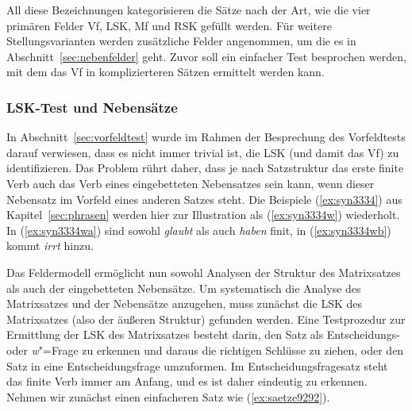All diese Bezeichnungen kategorisieren die Sätze nach der Art, wie die vier primären Felder Vf, LSK, Mf und RSK gefüllt werden.
Für weitere Stellungsvarianten werden zusätzliche Felder angenommen, um die es in Abschnitt~\ref{sec:nebenfelder} geht.
Zuvor soll ein einfacher Test besprochen werden, mit dem das Vf in komplizierteren Sätzen ermittelt werden kann.

\subsubsection{LSK-Test und Nebensätze}

\label{sec:lsktest}

In Abschnitt~\ref{sec:vorfeldtest} wurde im Rahmen der Besprechung des Vorfeldtests darauf verwiesen, dass es nicht immer trivial ist, die LSK (und damit das Vf) zu identifizieren.
Das Problem rührt daher, dass je nach Satzstruktur das erste finite Verb auch das Verb eines eingebetteten Nebensatzes sein kann, wenn dieser Nebensatz \zB im Vorfeld eines anderen Satzes steht.
Die Beispiele (\ref{ex:syn3334}) aus Kapitel~\ref{sec:phrasen} werden hier zur Illustration als (\ref{ex:syn3334w}) wiederholt.
In (\ref{ex:syn3334wa}) sind sowohl \textit{glaubt} als auch \textit{haben} finit, in (\ref{ex:syn3334wb}) kommt \textit{irrt} hinzu.

\begin{exe}
  \ex\label{ex:syn3334w}
  \begin{xlist}
  \end{xlist}
\end{exe}

Das Feldermodell ermöglicht nun sowohl Analysen der Struktur des Matrixsatzes als auch der eingebetteten Nebensätze.
Um systematisch die Analyse des Matrixsatzes und der Nebensätze anzugehen, muss zunächst die LSK des Matrixsatzes (also der äußeren Struktur) gefunden werden.
Eine Testprozedur zur Ermittlung der LSK des Matrixsatzes besteht darin, den Satz als Entscheidungs- oder \textit{w}"=Frage zu erkennen und daraus die richtigen Schlüsse zu ziehen, oder den Satz in eine Entscheidungsfrage umzuformen.
Im Entscheidungsfragesatz steht das finite Verb immer am Anfang, und es ist daher eindeutig zu erkennen.
Nehmen wir zunächst einen einfacheren Satz wie (\ref{ex:saetze9292}).

\begin{exe}
\end{exe}

